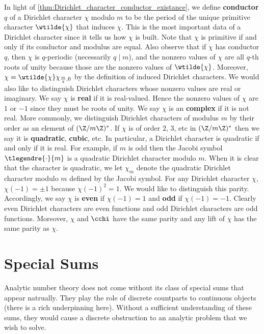       In light of \cref{thm:Dirichlet_character_conductor_existance}, we define \textbf{conductor} $q$ of a Dirichlet character $\chi$ modulo $m$ to be the period of the unique primitive character $\wtilde{\chi}$ that induces $\chi$. This is the most important data of a Dirichlet character since it tells us how $\chi$ is built. Note that $\chi$ is primitive if and only if its conductor and modulus are equal. Also observe that if $\chi$ has conductor $q$, then $\chi$ is $q$-periodic (necessarily $q \mid m$), and the nonzero values of $\chi$ are all $q$-th roots of unity because those are the nonzero values of $\wtilde{\chi}$. Moreover, $\chi = \wtilde{\chi}\chi_{\frac{m}{q},0}$ by the definition of induced Dirichlet characters. We would also like to distinguish Dirichlet characters whose nonzero values are real or imaginary. We say $\chi$ is \textbf{real} if it is real-valued. Hence the nonzero values of $\chi$ are $1$ or $-1$ since they must be roots of unity. We say $\chi$ is an \textbf{complex} if it is not real. More commonly, we distinguish Dirichlet characters of modulus $m$ by their order as an element of $(\Z/m\Z)^{\ast}$. If $\chi$ is of order $2$, $3$, etc in $(\Z/m\Z)^{\ast}$ then we say it is \textbf{quadratic}, \textbf{cubic}, etc. In particular, a Dirichlet character is quadratic if and only if it is real. For example, if $m$ is odd then the Jacobi symbol $\tlegendre{\cdot}{m}$ is a quadratic Dirichlet character modulo $m$. When it is clear that the character is quadratic, we let $\chi_{m}$ denote the quadratic Dirichlet character modulo $m$ defined by the Jacobi symbol. For any Dirichlet character $\chi$, $\chi(-1) = \pm 1$ because $\chi(-1)^{2} = 1$. We would like to distinguish this parity. Accordingly, we say $\chi$ is \textbf{even} if $\chi(-1) = 1$ and \textbf{odd} if $\chi(-1) = -1$. Clearly even Dirichlet characters are even functions and odd Dirichlet characters are odd functions. Moreover, $\chi$ and $\cchi$ have the same parity and any lift of $\chi$ has the same parity as $\chi$.
    \section{Special Sums}
      Analytic number theory does not come without its class of special sums that appear natrually. They play the role of discrete countparts to continuous objects (there is a rich underpinning here). Without a sufficient understanding of these sums, they would cause a discrete obstruction to an analytic problem that we wish to solve.
